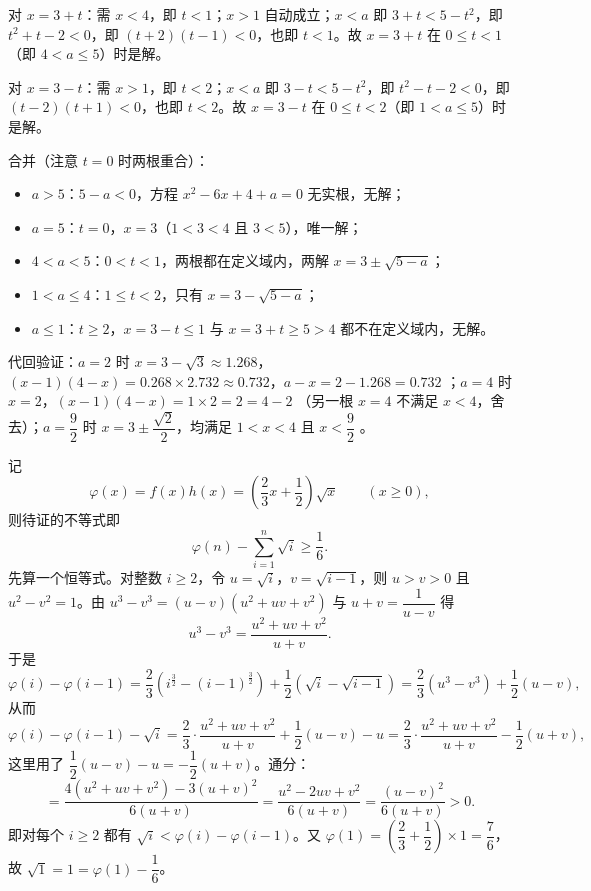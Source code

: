 \begin{answer}
对 $x=3+t$：需 $x<4$，即 $t<1$；$x>1$ 自动成立；$x<a$ 即 $3+t<5-t^2$，即 $t^2+t-2<0$，即 $(t+2)(t-1)<0$，也即 $t<1$。故 $x=3+t$ 在 $0\leqslant t<1$（即 $4<a\leqslant5$）时是解。

对 $x=3-t$：需 $x>1$，即 $t<2$；$x<a$ 即 $3-t<5-t^2$，即 $t^2-t-2<0$，即 $(t-2)(t+1)<0$，也即 $t<2$。故 $x=3-t$ 在 $0\leqslant t<2$（即 $1<a\leqslant5$）时是解。

合并（注意 $t=0$ 时两根重合）：

\begin{itemize}
\item $a>5$：$5-a<0$，方程 $x^2-6x+4+a=0$ 无实根，无解；
\item $a=5$：$t=0$，$x=3$（$1<3<4$ 且 $3<5$），唯一解；
\item $4<a<5$：$0<t<1$，两根都在定义域内，两解 $x=3\pm\sqrt{5-a}$；
\item $1<a\leqslant4$：$1\leqslant t<2$，只有 $x=3-\sqrt{5-a}$；
\item $a\leqslant1$：$t\geqslant2$，$x=3-t\leqslant1$ 与 $x=3+t\geqslant5>4$ 都不在定义域内，无解。
\end{itemize}

代回验证：$a=2$ 时 $x=3-\sqrt3\approx1.268$，$(x-1)(4-x)=0.268\times2.732\approx0.732$，$a-x=2-1.268=0.732$ ；$a=4$ 时 $x=2$，$(x-1)(4-x)=1\times2=2=4-2$ （另一根 $x=4$ 不满足 $x<4$，舍去）；$a=\dfrac92$ 时 $x=3\pm\dfrac{\sqrt2}{2}$，均满足 $1<x<4$ 且 $x<\dfrac92$ 。


记
\nopagebreak[4]
\[
\varphi(x)=f(x)h(x)=\left(\frac23x+\frac12\right)\sqrt x\qquad(x\geqslant0),
\]
则待证的不等式即
\nopagebreak[4]
\[
\varphi(n)-\sum_{i=1}^{n}\sqrt i\geqslant\frac16.
\]
先算一个恒等式。对整数 $i\geqslant2$，令 $u=\sqrt i$，$v=\sqrt{i-1}$，则 $u>v>0$ 且 $u^2-v^2=1$。由 $u^3-v^3=(u-v)(u^2+uv+v^2)$ 与 $u+v=\dfrac{1}{u-v}$ 得
\nopagebreak[4]
\[
u^3-v^3=\frac{u^2+uv+v^2}{u+v}.
\]
于是
\nopagebreak[4]
\[
\varphi(i)-\varphi(i-1)
=\frac23\left(i^{\frac32}-(i-1)^{\frac32}\right)+\frac12\left(\sqrt i-\sqrt{i-1}\right)
=\frac23(u^3-v^3)+\frac12(u-v),
\]
从而
\nopagebreak[4]
\[
\varphi(i)-\varphi(i-1)-\sqrt i
=\frac23\cdot\frac{u^2+uv+v^2}{u+v}+\frac12(u-v)-u
=\frac23\cdot\frac{u^2+uv+v^2}{u+v}-\frac12(u+v),
\]
这里用了 $\dfrac12(u-v)-u=-\dfrac12(u+v)$。通分：
\nopagebreak[4]
\[
=\frac{4(u^2+uv+v^2)-3(u+v)^2}{6(u+v)}
=\frac{u^2-2uv+v^2}{6(u+v)}=\frac{(u-v)^2}{6(u+v)}>0.
\]
即对每个 $i\geqslant2$ 都有 $\sqrt i<\varphi(i)-\varphi(i-1)$。又 $\varphi(1)=\left(\dfrac23+\dfrac12\right)\times1=\dfrac76$，故 $\sqrt1=1=\varphi(1)-\dfrac16$。


\end{answer}
